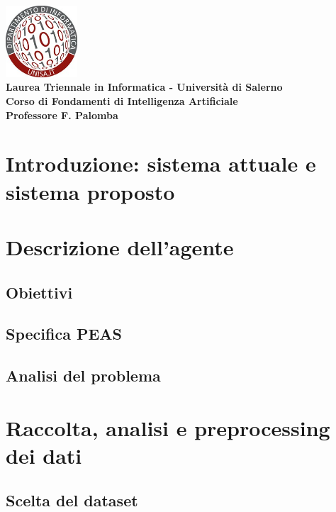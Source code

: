 \documentclass[a4paper,12pt]{article}
\begin{document}
\begin{center}
    \includegraphics[width=0.2\textwidth]{logo.jpg}\\[0.5cm]
    \textbf{\large Laurea Triennale in Informatica - Università di Salerno}\\
    \textbf{\large Corso di Fondamenti di Intelligenza Artificiale}\\
    \textbf{\large Professore F. Palomba}\\[1.5cm]
    \textcolor{titlecolor}{\Huge }
\end{center}

\vspace{-2cm}

\setcounter{tocdepth}{3}
\renewcommand{\contentsname}{\textcolor{blue}{Sommario}}
\tableofcontents

\newpage

\section{Introduzione: sistema attuale e sistema proposto}
\section{Descrizione dell’agente}
\subsection{Obiettivi}
\subsection{Specifica PEAS}
\subsection{Analisi del problema}
\section{Raccolta, analisi e preprocessing dei dati}
\subsection{Scelta del dataset}
\end{document}
